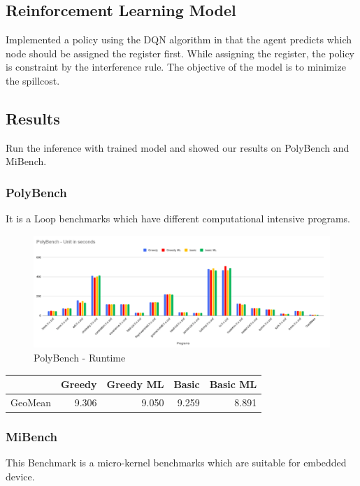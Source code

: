 \subsection{Reinforcement Learning Model}
Implemented a policy using the DQN algorithm in that the agent predicts which node should be assigned the register first.  While assigning the register, the policy is constraint by the interference rule. The objective of the model is to minimize the spillcost.

\subsection{Results}

Run the inference with trained model and showed our results on PolyBench and MiBench.
\subsubsection{PolyBench}
It is a Loop benchmarks which have different computational intensive programs.

\begin{figure}[t]
    \centering
    \includegraphics[scale=0.4]{figures/chapter-5/polybench.png}
    \caption{PolyBench - Runtime}
     \label{fig:mlra-polybench}
\end{figure}


\begin{table}[h]
\begin{tabular}{|l|l|l|l|l|}
\hline
 & \textbf{Greedy} & \textbf{Greedy ML} & \textbf{Basic} & \textbf{Basic ML} \\ \hline
GeoMean & \multicolumn{1}{r|}{9.306} & \multicolumn{1}{r|}{9.050} & \multicolumn{1}{r|}{9.259} & \multicolumn{1}{r|}{8.891} \\ \hline
\end{tabular}
\centering
\end{table}

\subsubsection{MiBench}
This Benchmark is a micro-kernel benchmarks which are suitable for embedded device.

